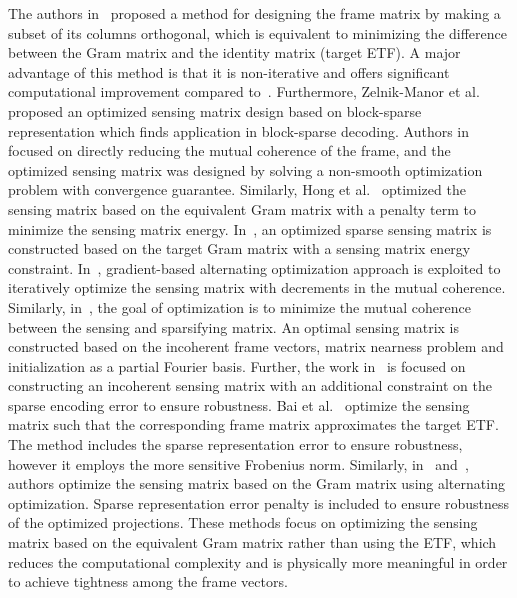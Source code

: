 The authors in~\cite{Sapiro} proposed a method for designing the frame matrix by making a subset of its columns orthogonal, which is equivalent to minimizing the difference between the Gram matrix and the identity matrix (target ETF). A major advantage of this method is that it is non-iterative and offers significant computational improvement compared to~\cite{Elad}. Furthermore, Zelnik-Manor et al.~\cite{Zelnik} proposed an optimized sensing matrix design based on block-sparse representation which finds application in block-sparse decoding. Authors in~\cite{CHZ} focused on directly reducing the mutual coherence of the frame, and the optimized sensing matrix was designed by solving a non-smooth optimization problem with convergence guarantee. Similarly, Hong et al.~\cite{HONG_robust} optimized the sensing matrix based on the equivalent Gram matrix with a penalty term to minimize the sensing matrix energy. In~\cite{HONG_sparse}, an optimized sparse sensing matrix is constructed based on the target Gram matrix with a sensing matrix energy constraint. In~\cite{Vahid}, gradient-based alternating optimization approach is exploited to iteratively optimize the sensing matrix with decrements in the mutual coherence. Similarly, in~\cite{Measurement_Rahim}, the goal of optimization is to minimize the mutual coherence between the sensing and sparsifying matrix. An optimal sensing matrix is constructed based on the incoherent frame vectors, matrix nearness problem and initialization as a partial Fourier basis. Further, the work in~\cite{SRE_Huang} is focused on constructing an incoherent sensing matrix with an additional constraint on the sparse encoding error to ensure robustness. Bai et al.~\cite{SRE_Huang} optimize the sensing matrix such that the corresponding frame matrix approximates the target ETF. The method includes the sparse representation error to ensure robustness, however it employs the more sensitive Frobenius norm. Similarly, in~\cite{HONG_new_ref} and~\cite{Gangli_robust}, authors optimize the sensing matrix based on the Gram matrix using alternating optimization. Sparse representation error penalty is included to ensure robustness of the optimized projections. These methods focus on optimizing the sensing matrix based on the equivalent Gram matrix rather than using the ETF, which reduces the computational complexity and is physically more meaningful in order to achieve tightness among the frame vectors.
%
